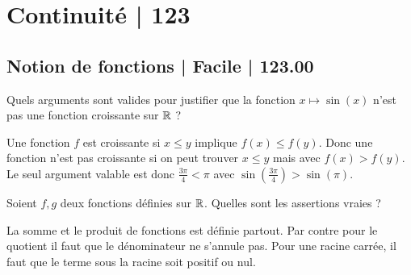 



\section{Continuité | 123}

\subsection{Notion de fonctions | Facile | 123.00}

\begin{question}
Quels arguments sont valides pour justifier que la fonction $x \mapsto \sin(x)$ n'est pas une fonction croissante sur $\mathbb{R}$ ?

\begin{answers}



\end{answers}
\begin{explanations}
Une fonction $f$ est croissante si $x \le y$ implique $f(x) \le f(y)$.
Donc une fonction n'est pas croissante si on peut trouver $x \le y$ mais avec
$f(x) > f(y)$. Le seul argument valable est donc $\frac{3\pi}{4} < \pi$ avec $\sin(\frac{3\pi}{4}) > \sin(\pi)$.
\end{explanations}
\end{question}


\begin{question}
Soient $f,g$ deux fonctions définies sur $\mathbb{R}$. Quelles sont les assertions vraies ?
\begin{answers}



   
\end{answers}
\begin{explanations}
La somme et le produit de fonctions est définie partout. Par contre pour le quotient il faut que le dénominateur ne s'annule pas. Pour une racine carrée, il faut que le terme sous la racine soit positif ou nul.
\end{explanations}
\end{question}


